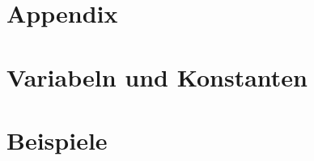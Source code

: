 \documentclass[numerate]{cheatsheet}
\begin{document}
\section{Appendix}
    
    
    \vfill \null \columnbreak

\section{Variabeln und Konstanten}
    
    
    
    
    
    \newpage

\section{Beispiele}
    
    \vfill \null \columnbreak
    
\end{document}
